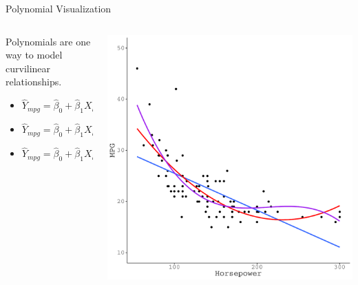 \documentclass{beamer}\usepackage[]{graphicx}\usepackage[]{color}
\makeatletter
\def\maxwidth{ %
  \ifdim\Gin@nat@width>\linewidth
    \linewidth
  \else
    \Gin@nat@width
  \fi
}
\newenvironment{knitrout}{}{} %
\makeatother
\begin{document}
\begin{frame}{Polynomial Visualization}
  
  \begin{columns}
    \begin{column}{0.5\textwidth}
      Polynomials are one way to model curvilinear relationships.
      \vb
      \begin{itemize}  
      \item {\color{blue}$\hat{Y}_{mpg} = \hat{\beta}_0 + \hat{\beta}_1 X_{hp}$}
        \vb
      \item {\color{red}$\hat{Y}_{mpg} = \hat{\beta}_0 + \hat{\beta}_1 X_{hp} + 
        \hat{\beta}_2 X_{hp}^2$}
        \vb
      \item {\color{violet}$\hat{Y}_{mpg} = \hat{\beta}_0 + \hat{\beta}_1 X_{hp} + 
        \hat{\beta}_2 X_{hp}^2 + \hat{\beta}_3 X_{hp}^3$}
      \end{itemize}
    \end{column}
    
    \begin{column}{0.5\textwidth}
      
\begin{knitrout}\footnotesize
{}\color{fgcolor}

{\centering \includegraphics[width=\maxwidth]{figure/unnamed-chunk-27-1} 

}



\end{knitrout}

\end{column}
\end{columns}

\end{frame}
\end{document}
